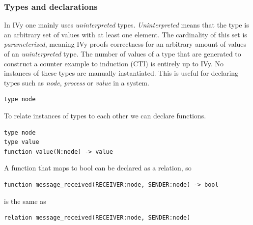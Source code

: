 \documentclass[fleqn]{article}
\begin{document}
\subsubsection{Types and declarations}
In IVy one mainly uses \textit{uninterpreted} types. \textit{Uninterpreted} means that the type is an arbitrary set of values with at least one element.
The cardinality of this set is \textit{parameterized}, meaning IVy proofs correctness for an arbitrary amount of values of an \textit{uninterpreted} type.
The number of values of a type that are generated to construct a counter example to induction (CTI) is entirely up to IVy. No instances of these types are manually instantiated.
This is useful for declaring types such as \textit{node}, \textit{process} or \textit{value} in a system.

\begin{mdframed}[backgroundcolor=light-gray, roundcorner=10pt,leftmargin=1, rightmargin=1, innerleftmargin=15, innertopmargin=15,innerbottommargin=15, outerlinewidth=1, linecolor=light-gray]
\begin{lstlisting}
type node
\end{lstlisting}
\end{mdframed}

\noindent To relate instances of types to each other we can declare functions.

\begin{mdframed}[backgroundcolor=light-gray, roundcorner=10pt,leftmargin=1, rightmargin=1, innerleftmargin=15, innertopmargin=15,innerbottommargin=15, outerlinewidth=1, linecolor=light-gray]
\begin{lstlisting}
type node
type value
function value(N:node) -> value
\end{lstlisting}
\end{mdframed}

\noindent A function that maps to bool can be declared as a relation, so

\begin{mdframed}[backgroundcolor=light-gray, roundcorner=10pt,leftmargin=1, rightmargin=1, innerleftmargin=15, innertopmargin=15,innerbottommargin=15, outerlinewidth=1, linecolor=light-gray]
\begin{lstlisting}
function message_received(RECEIVER:node, SENDER:node) -> bool
\end{lstlisting}
\end{mdframed}

\noindent is the same as

\begin{mdframed}[backgroundcolor=light-gray, roundcorner=10pt,leftmargin=1, rightmargin=1, innerleftmargin=15, innertopmargin=15,innerbottommargin=15, outerlinewidth=1, linecolor=light-gray]
\begin{lstlisting}
relation message_received(RECEIVER:node, SENDER:node)
\end{lstlisting}
\end{mdframed}
\end{document}
